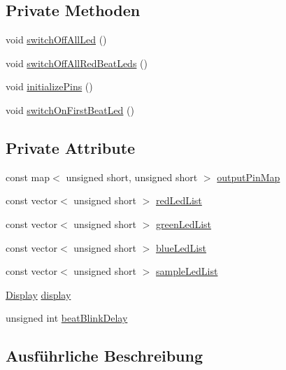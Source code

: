 \subsection*{Private Methoden}
\begin{DoxyCompactItemize}
\item 
void \hyperlink{class_rasp_output_controller_afdd3bcfa82341a9d2539233abe7cb617}{switch\+Off\+All\+Led} ()
\item 
void \hyperlink{class_rasp_output_controller_a9a5025e13e27544721a80e6725ed23e4}{switch\+Off\+All\+Red\+Beat\+Leds} ()
\item 
void \hyperlink{class_rasp_output_controller_a1172c2966777bbcee89cbe4e6de027d5}{initialize\+Pins} ()
\item 
void \hyperlink{class_rasp_output_controller_a0cacbc3cbca8f1b78318234c6b74e576}{switch\+On\+First\+Beat\+Led} ()
\end{DoxyCompactItemize}
\subsection*{Private Attribute}
\begin{DoxyCompactItemize}
\item 
const map$<$ unsigned short, unsigned short $>$ \hyperlink{class_rasp_output_controller_afd8a9fff94ee9bcf63bcbe6fa810aa32}{output\+Pin\+Map}
\item 
const vector$<$ unsigned short $>$ \hyperlink{class_rasp_output_controller_a8ee2d3ff908d1094cc9d1320133d0bdf}{red\+Led\+List}
\item 
const vector$<$ unsigned short $>$ \hyperlink{class_rasp_output_controller_a8b888abfd8719eb95568abaf53d68d5c}{green\+Led\+List}
\item 
const vector$<$ unsigned short $>$ \hyperlink{class_rasp_output_controller_a9b5e5c4ee94d43d62e41961e6c8bea3b}{blue\+Led\+List}
\item 
const vector$<$ unsigned short $>$ \hyperlink{class_rasp_output_controller_ad0ad19b081450eb1d9cd6548c14a23ea}{sample\+Led\+List}
\item 
\hyperlink{class_display}{Display} \hyperlink{class_rasp_output_controller_a0bb52cfee18c44cd2ed64dea27d5ccc4}{display}
\item 
unsigned int \hyperlink{class_rasp_output_controller_a4deb199f7d611c2be39dc2d59ea45bba}{beat\+Blink\+Delay}
\end{DoxyCompactItemize}


\subsection{Ausführliche Beschreibung}


